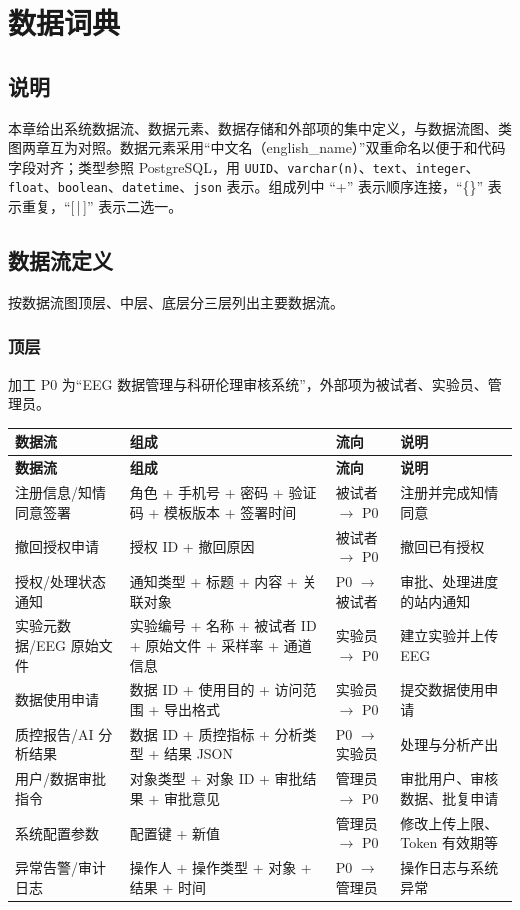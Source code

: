 \section{数据词典}

\subsection{说明}

本章给出系统数据流、数据元素、数据存储和外部项的集中定义，与数据流图、类图两章互为对照。数据元素采用``中文名（english\_name）''双重命名以便于和代码字段对齐；类型参照 PostgreSQL，用 \texttt{UUID}、\texttt{varchar(n)}、\texttt{text}、\texttt{integer}、\texttt{float}、\texttt{boolean}、\texttt{datetime}、\texttt{json} 表示。组成列中 ``+'' 表示顺序连接，``\{\}'' 表示重复，``[\,|\,]'' 表示二选一。

\subsection{数据流定义}
\label{sec:dd-flow}

按数据流图顶层、中层、底层分三层列出主要数据流。

\subsubsection{顶层}

加工 P0 为``EEG 数据管理与科研伦理审核系统''，外部项为被试者、实验员、管理员。

{\small
\begin{longtable}{|p{26mm}|p{48mm}|p{26mm}|p{28mm}|}
\hline
\textbf{数据流} & \textbf{组成} & \textbf{流向} & \textbf{说明}\\\hline
\endfirsthead
\hline
\textbf{数据流} & \textbf{组成} & \textbf{流向} & \textbf{说明}\\\hline
\endhead
注册信息/知情同意签署 & 角色 + 手机号 + 密码 + 验证码 + 模板版本 + 签署时间 & 被试者 $\to$ P0 & 注册并完成知情同意 \\ \hline
撤回授权申请 & 授权 ID + 撤回原因 & 被试者 $\to$ P0 & 撤回已有授权 \\ \hline
授权/处理状态通知 & 通知类型 + 标题 + 内容 + 关联对象 & P0 $\to$ 被试者 & 审批、处理进度的站内通知 \\ \hline
实验元数据/EEG 原始文件 & 实验编号 + 名称 + 被试者 ID + 原始文件 + 采样率 + 通道信息 & 实验员 $\to$ P0 & 建立实验并上传 EEG \\ \hline
数据使用申请 & 数据 ID + 使用目的 + 访问范围 + 导出格式 & 实验员 $\to$ P0 & 提交数据使用申请 \\ \hline
质控报告/AI 分析结果 & 数据 ID + 质控指标 + 分析类型 + 结果 JSON & P0 $\to$ 实验员 & 处理与分析产出 \\ \hline
用户/数据审批指令 & 对象类型 + 对象 ID + 审批结果 + 审批意见 & 管理员 $\to$ P0 & 审批用户、审核数据、批复申请 \\ \hline
系统配置参数 & 配置键 + 新值 & 管理员 $\to$ P0 & 修改上传上限、Token 有效期等 \\ \hline
异常告警/审计日志 & 操作人 + 操作类型 + 对象 + 结果 + 时间 & P0 $\to$ 管理员 & 操作日志与系统异常 \\ \hline
\end{longtable}
}

